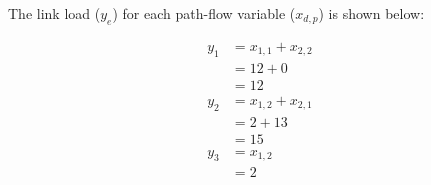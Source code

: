 The link load ($y_e$) for each path-flow variable ($x_{d,p}$) is shown below:

\begin{align*}
	y_1 &= x_{1,1} + x_{2,2} \\
	    &= 12 + 0 \\
	    &= 12 \\
	y_2 &= x_{1,2} + x_{2,1} \\
	    &= 2 + 13 \\
	    &= 15 \\
	y_3 &= x_{1,2} \\
	    &= 2 \\
\end{align*}
